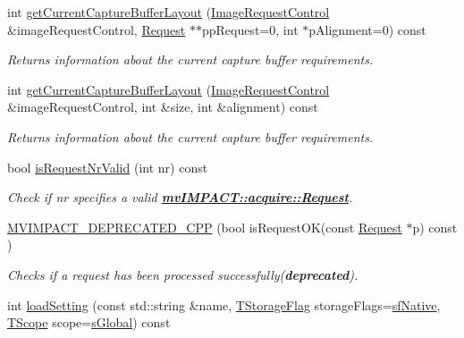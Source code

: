 \begin{DoxyCompactItemize}
int \hyperlink{classmv_i_m_p_a_c_t_1_1acquire_1_1_function_interface_a45d71bedd05998dd9839e1fddc219d5a}{get\+Current\+Capture\+Buffer\+Layout} (\hyperlink{classmv_i_m_p_a_c_t_1_1acquire_1_1_image_request_control}{Image\+Request\+Control} \&image\+Request\+Control, \hyperlink{classmv_i_m_p_a_c_t_1_1acquire_1_1_request}{Request} $\ast$$\ast$pp\+Request=0, int $\ast$p\+Alignment=0) const 
\begin{DoxyCompactList}\small\item\em Returns information about the current capture buffer requirements. \end{DoxyCompactList}\item 
int \hyperlink{classmv_i_m_p_a_c_t_1_1acquire_1_1_function_interface_ae7b571a1f0d1cbaebfb7d117799edcd0}{get\+Current\+Capture\+Buffer\+Layout} (\hyperlink{classmv_i_m_p_a_c_t_1_1acquire_1_1_image_request_control}{Image\+Request\+Control} \&image\+Request\+Control, int \&size, int \&alignment) const 
\begin{DoxyCompactList}\small\item\em Returns information about the current capture buffer requirements. \end{DoxyCompactList}\item 
bool \hyperlink{classmv_i_m_p_a_c_t_1_1acquire_1_1_function_interface_a44e5c0d39914e25243bc61c18cc5d954}{is\+Request\+Nr\+Valid} (int nr) const 
\begin{DoxyCompactList}\small\item\em Check if {\itshape nr} specifies a valid {\bfseries \hyperlink{classmv_i_m_p_a_c_t_1_1acquire_1_1_request}{mv\+I\+M\+P\+A\+C\+T\+::acquire\+::\+Request}}. \end{DoxyCompactList}\item 
\hyperlink{classmv_i_m_p_a_c_t_1_1acquire_1_1_function_interface_ae494724c1e29e38f0e83e8a5f5793772}{M\+V\+I\+M\+P\+A\+C\+T\+\_\+\+D\+E\+P\+R\+E\+C\+A\+T\+E\+D\+\_\+\+C\+P\+P} (bool is\+Request\+O\+K(const \hyperlink{classmv_i_m_p_a_c_t_1_1acquire_1_1_request}{Request} $\ast$p) const )
\begin{DoxyCompactList}\small\item\em Checks if a request has been processed successfully({\bfseries deprecated}). \end{DoxyCompactList}\item 
int \hyperlink{classmv_i_m_p_a_c_t_1_1acquire_1_1_function_interface_ab670f49c3a55f7e90d52935a9194bdb0}{load\+Setting} (const std\+::string \&name, \hyperlink{group___common_interface_ga9390ccf3b2ebe68eee998798d59dc823}{T\+Storage\+Flag} storage\+Flags=\hyperlink{group___common_interface_gga9390ccf3b2ebe68eee998798d59dc823a7558412f9b613d098c692dbd1dab68b2}{sf\+Native}, \hyperlink{group___common_interface_gae6cc8fec0123f239690564ecdeba4350}{T\+Scope} scope=\hyperlink{group___common_interface_ggae6cc8fec0123f239690564ecdeba4350a54b8661877c9fef76d20cc2b83722c60}{s\+Global}) const 
$$
\end{DoxyCompactItemize}
